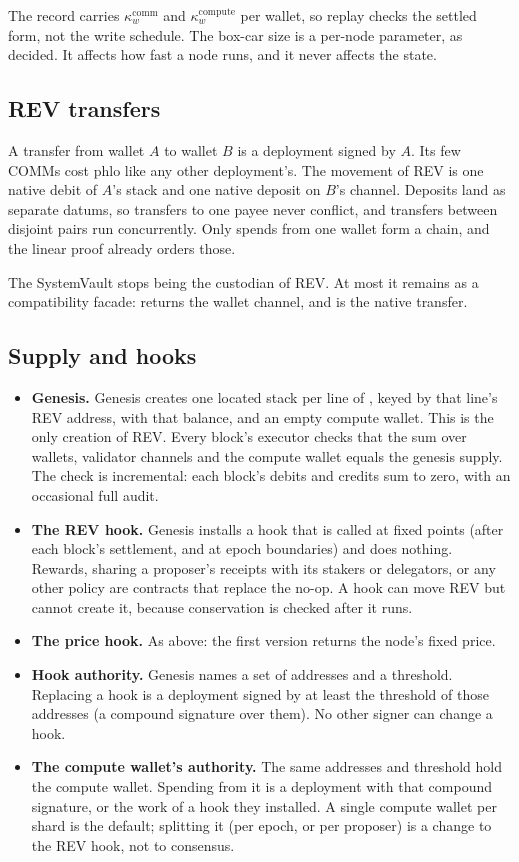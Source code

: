 \documentclass[11pt]{article}
\newcommand{\code}{\path}
\begin{document}
The record carries $\kappa^{\mathrm{comm}}_w$ and $\kappa^{\mathrm{compute}}_w$ per wallet, so replay checks the settled form, not the write schedule. The box-car size is a per-node parameter, as decided. It affects how fast a node runs, and it never affects the state.

\subsection{REV transfers}

A transfer from wallet $A$ to wallet $B$ is a deployment signed by $A$. Its few COMMs cost phlo like any other deployment's. The movement of REV is one native debit of $A$'s stack and one native deposit on $B$'s channel. Deposits land as separate datums, so transfers to one payee never conflict, and transfers between disjoint pairs run concurrently. Only spends from one wallet form a chain, and the linear proof already orders those.

The SystemVault stops being the custodian of REV. At most it remains as a compatibility facade: \code{find} returns the wallet channel, and \code{transfer} is the native transfer.

\subsection{Supply and hooks}\label{sec:supply}

\begin{itemize}
\item \textbf{Genesis.} Genesis creates one located stack per line of \code{wallets.txt}, keyed by that line's REV address, with that balance, and an empty compute wallet. This is the only creation of REV. Every block's executor checks that the sum over wallets, validator channels and the compute wallet equals the genesis supply. The check is incremental: each block's debits and credits sum to zero, with an occasional full audit.
\item \textbf{The REV hook.} Genesis installs a hook that is called at fixed points (after each block's settlement, and at epoch boundaries) and does nothing. Rewards, sharing a proposer's receipts with its stakers or delegators, or any other policy are contracts that replace the no-op. A hook can move REV but cannot create it, because conservation is checked after it runs.
\item \textbf{The price hook.} As above: the first version returns the node's fixed price.
\item \textbf{Hook authority.} Genesis names a set of addresses and a threshold. Replacing a hook is a deployment signed by at least the threshold of those addresses (a compound signature over them). No other signer can change a hook.
\item \textbf{The compute wallet's authority.} The same addresses and threshold hold the compute wallet. Spending from it is a deployment with that compound signature, or the work of a hook they installed. A single compute wallet per shard is the default; splitting it (per epoch, or per proposer) is a change to the REV hook, not to consensus.
\end{itemize}
\end{document}
